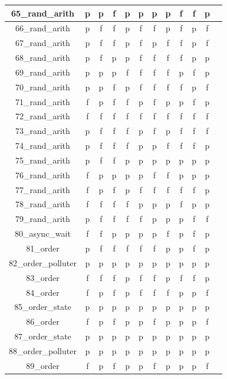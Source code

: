 \documentclass[
fancyheadings, %
%
%
]{stsreprt}
\begin{document}
\begin{longtable}{|c|c|c|c|c|c|c|c|c|c|c|c|}
\hline
65\_rand\_arith & p & p & f & p & p & p & p & f & f & p \\
\hline
66\_rand\_arith & p & f & f & p & f & f & p & f & p & f \\
\hline
67\_rand\_arith & p & f & f & p & f & p & f & f & p & f \\
\hline
68\_rand\_arith & p & f & p & p & f & f & f & f & p & p \\
\hline
69\_rand\_arith & p & p & p & f & f & f & f & p & f & p \\
\hline
70\_rand\_arith & p & p & f & p & f & f & f & f & p & f \\
\hline
71\_rand\_arith & f & p & f & f & p & f & p & p & f & p \\
\hline
72\_rand\_arith  & f & f & f & f & f & f & f & f & f & f \\
\hline
73\_rand\_arith & p & f & f & f & p & f & p & f & f & f \\
\hline
74\_rand\_arith & p & f & f & f & p & p & f & f & f & p \\
\hline
75\_rand\_arith & p & f & f & p & p & p & p & p & p & p \\
\hline
76\_rand\_arith & f & p & p & p & p & f & f & p & p & p \\
\hline
77\_rand\_arith & f & p & f & p & f & f & f & f & f & p \\
\hline
78\_rand\_arith & f & f & f & f & p & p & p & f & p & p \\
\hline
79\_rand\_arith & p & f & f & f & f & p & p & p & f & f \\
\hline
80\_async\_wait & f & f & p & p & p & p & f & p & f & p \\
\hline
81\_order & p & f & f & f & f & f & p & p & f & p \\
\hline
82\_order\_polluter & p & p & p & p & p & p & p & p & p & p \\
\hline
83\_order & f & f & f & p & f & f & p & f & f & p \\
\hline
84\_order & f & p & f & p & f & f & f & p & p & f \\
\hline
85\_order\_state & p & p & p & p & p & p & p & p & p & p \\
\hline
86\_order & f & p & f & p & p & f & p & p & p & f \\
\hline
87\_order\_state & p & p & p & p & p & p & p & p & p & p \\
\hline
88\_order\_polluter & p & p & p & p & p & p & p & p & p & p \\
\hline
89\_order & f & p & f & p & p & f & p & p & p & f \\

\end{longtable}
\end{document}
